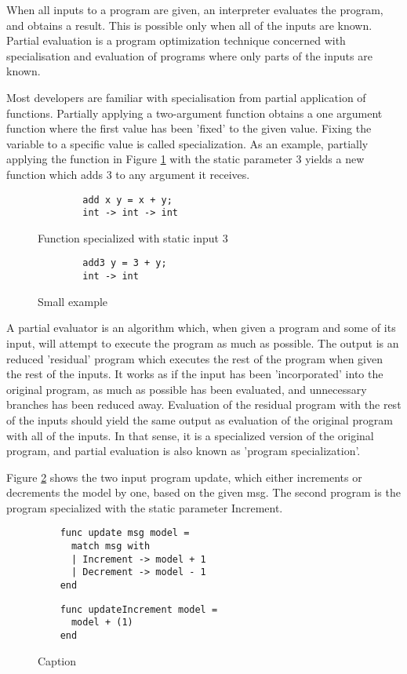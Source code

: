 When all inputs to a program are given, an interpreter evaluates the program, and obtains a result. This is possible only when all of the inputs are known. 
Partial evaluation is a program optimization technique concerned with specialisation and evaluation of programs where only parts of the inputs are known. 

Most developers are familiar with specialisation from partial application of functions. Partially applying a two-argument function obtains a one argument function where the first value has been 'fixed' to the given value. Fixing the variable to a specific value is called specialization. As an example, partially applying the function in Figure \ref{fig:specialize-easy} with the static parameter 3 yields a new function which adds 3 to any argument it receives. 
\begin{figure}
    \begin{verbatim}
        add x y = x + y;
        int -> int -> int
    \end{verbatim}
Function specialized with static input 3
    \begin{verbatim}
        add3 y = 3 + y;
        int -> int
    \end{verbatim}
    \caption{Small example}
    \label{fig:specialize-easy}
\end{figure}

A partial evaluator is an algorithm which, when given a program and some of its input, will attempt to execute the program as much as possible. The output is an reduced 'residual' program which executes the rest of the program when given the rest of the inputs. It works as if the input has been 'incorporated' into the original program, as much as possible has been evaluated, and unnecessary branches has been reduced away. Evaluation of the residual program with the rest of the inputs should yield the same output as evaluation of the original program with all of the inputs. In that sense, it is a specialized version of the original program, and partial evaluation is also known as 'program specialization'.

Figure \ref{fig:specialize-update} shows the two input program update, which either increments or decrements the model by one, based on the given msg. The second program is the program specialized with the static parameter Increment.
\begin{figure}
    \begin{verbatim}
    func update msg model =
      match msg with
      | Increment -> model + 1
      | Decrement -> model - 1
    end
    \end{verbatim}
    
    \begin{verbatim}
    func updateIncrement model =
      model + (1)
    end
    \end{verbatim}
    
    \caption{Caption}
    \label{fig:specialize-update}
\end{figure}

